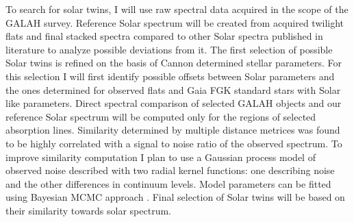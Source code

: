 To search for solar twins, I will use raw spectral data acquired in the scope of the GALAH survey. Reference Solar spectrum will be created from acquired twilight flats and final stacked spectra compared to other Solar spectra published in literature to analyze possible deviations from it. The first selection of possible Solar twins is refined on the basis of Cannon \cite{2015ApJ...808...16N} determined stellar parameters. For this selection I will first identify possible offsets between Solar parameters and the ones determined for observed flats and Gaia FGK standard stars \cite{2014A&A...564A.133J, 2015A&A...582A..49H} with Solar like parameters. Direct spectral comparison of selected GALAH objects and our reference Solar spectrum will be computed only for the regions of selected absorption lines. Similarity determined by multiple distance metrices was found to be highly correlated with a signal to noise ratio of the observed spectrum. To improve similarity computation I plan to use a Gaussian process \cite{2006gpml.book.....R} model of observed noise described with two radial kernel functions: one describing noise and the other differences in continuum levels. Model parameters can be fitted using Bayesian MCMC approach \cite{2013PASP..125..306F}. Final selection of Solar twins will be based on their similarity towards solar spectrum.